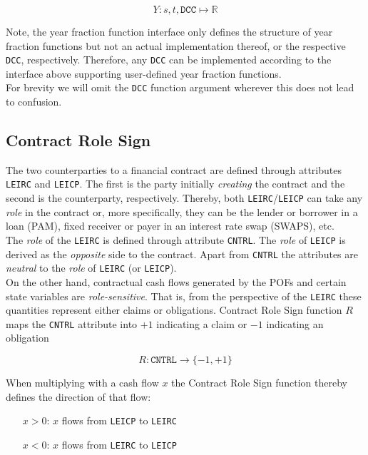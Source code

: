 \documentclass[9pt,oneside]{amsart}
\newcommand{\Real}{\mathbb{R}}
\newcommand{\attr}[1]{\texttt{#1}}
\newcommand{\yfrfunc}{Y}
\begin{document}
\begin{multicols}{2}
\[
	\yfrfunc: s,t,\attr{DCC} \mapsto \Real
\]

Note, the year fraction function interface only defines the structure of year fraction functions but not an actual implementation thereof, or the respective \attr{DCC}, respectively. Therefore, any \attr{DCC} can be implemented according to the interface above supporting user-defined year fraction functions.\\

For brevity we will omit the \attr{DCC} function argument wherever this does not lead to confusion.


\subsection{Contract Role Sign}

The two counterparties to a financial contract are defined through attributes \attr{LEIRC} and \attr{LEICP}. The first is the party initially \textit{creating} the contract and the second is the counterparty, respectively. Thereby, both \attr{LEIRC}/\attr{LEICP} can take any \textit{role} in the contract or, more specifically, they can be the lender or borrower in a loan (PAM), fixed receiver or payer in an interest rate swap (SWAPS), etc.\\

The \textit{role} of the \attr{LEIRC} is defined through attribute \attr{CNTRL}. The \textit{role} of \attr{LEICP} is derived as the \textit{opposite} side to the contract. Apart from \attr{CNTRL} the attributes are \textit{neutral} to the \textit{role} of \attr{LEIRC} (or \attr{LEICP}).\\

On the other hand, contractual cash flows generated by the POFs and certain state variables are \textit{role-sensitive}. That is, from the perspective of the \attr{LEIRC} these quantities represent either claims or obligations. Contract Role Sign function $R$ maps the \attr{CNTRL} attribute into $+1$ indicating a claim or $-1$ indicating an obligation

\[
	R : \attr{CNTRL} \rightarrow \{-1, +1 \}
\]

When multiplying with a cash flow $x$ the Contract Role Sign function thereby defines the direction of that flow:

\begin{itemize}
	\item[$x>0$:] $x$ flows from \attr{LEICP} to \attr{LEIRC}
	
	\item[$x<0$:] $x$ flows from \attr{LEIRC} to \attr{LEICP}
\end{itemize}


\end{multicols}
\end{document}

